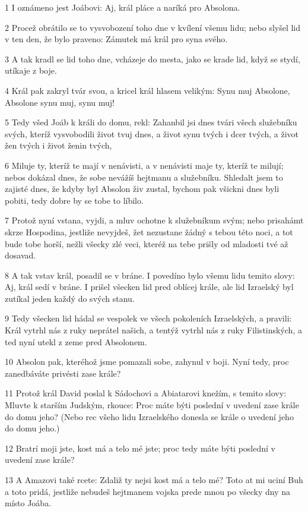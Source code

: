 \par 1 I oznámeno jest Joábovi: Aj, král pláce a naríká pro Absolona.
\par 2 Procež obrátilo se to vysvobození toho dne v kvílení všemu lidu; nebo slyšel lid v ten den, že bylo praveno: Zámutek má král pro syna svého.
\par 3 A tak kradl se lid toho dne, vcházeje do mesta, jako se krade lid, když se stydí, utíkaje z boje.
\par 4 Král pak zakryl tvár svou, a kricel král hlasem velikým: Synu muj Absolone, Absolone synu muj, synu muj!
\par 5 Tedy všed Joáb k králi do domu, rekl: Zahanbil jsi dnes tvári všech služebníku svých, kteríž vysvobodili život tvuj dnes, a život synu tvých i dcer tvých, a život žen tvých i život ženin tvých,
\par 6 Miluje ty, kteríž te mají v nenávisti, a v nenávisti maje ty, kteríž te milují; nebos dokázal dnes, že sobe nevážíš hejtmanu a služebníku. Shledalt jsem to zajisté dnes, že kdyby byl Absolon živ zustal, bychom pak všickni dnes byli pobiti, tedy dobre by se tobe to líbilo.
\par 7 Protož nyní vstana, vyjdi, a mluv ochotne k služebníkum svým; nebo prisahámt skrze Hospodina, jestliže nevyjdeš, žet nezustane žádný s tebou této noci, a tot bude tobe horší, nežli všecky zlé veci, kteréž na tebe prišly od mladosti tvé až dosavad.
\par 8 A tak vstav král, posadil se v bráne. I povedíno bylo všemu lidu temito slovy: Aj, král sedí v bráne. I prišel všecken lid pred oblícej krále, ale lid Izraelský byl zutíkal jeden každý do svých stanu.
\par 9 Tedy všecken lid hádal se vespolek ve všech pokoleních Izraelských, a pravili: Král vytrhl nás z ruky neprátel našich, a tentýž vytrhl nás z ruky Filistinských, a ted nyní utekl z zeme pred Absolonem.
\par 10 Absolon pak, kteréhož jsme pomazali sobe, zahynul v boji. Nyní tedy, proc zanedbáváte privésti zase krále?
\par 11 Protož král David poslal k Sádochovi a Abiatarovi knežím, s temito slovy: Mluvte k starším Judským, rkouce: Proc máte býti poslední v uvedení zase krále do domu jeho? (Nebo rec všeho lidu Izraelského donesla se krále o uvedení jeho do domu jeho.)
\par 12 Bratrí moji jste, kost má a telo mé jste; proc tedy máte býti poslední v uvedení zase krále?
\par 13 A Amazovi také rcete: Zdaliž ty nejsi kost má a telo mé? Toto at mi uciní Buh a toto pridá, jestliže nebudeš hejtmanem vojska prede mnou po všecky dny na místo Joába.
